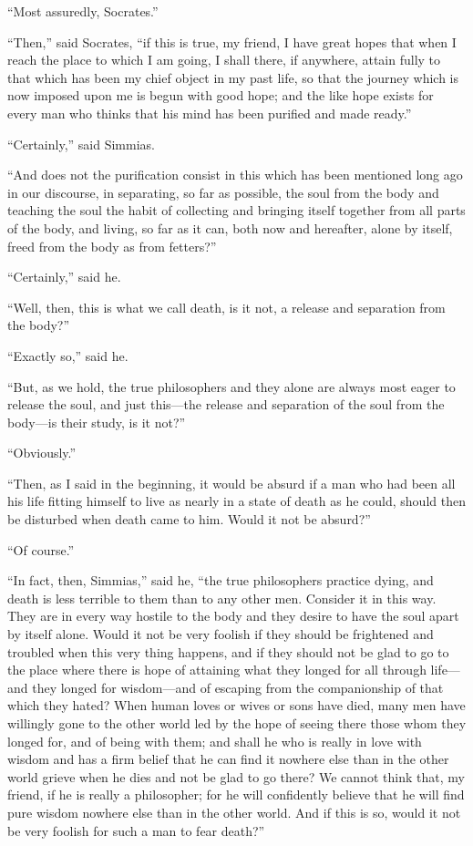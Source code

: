 \documentclass[letterpaper,12pt]{article}
\newcommand{\stephpag}[1]{\marginnote{\small\itshape\fontfamily{ppl}\selectfont #1}}
\begin{document}
\begin{drama}
``Most assuredly, Socrates.''
 
``Then,'' said Socrates, ``if this is true, my friend, I have great hopes that when I reach the place to which I am going, I shall there, if anywhere, attain fully to that which has been my chief object in my past life, so that the journey which is now \stephpag{c} imposed upon me is begun with good hope; and the like hope exists for every man who thinks that his mind has been purified and made ready.''
 
``Certainly,'' said Simmias.
 
``And does not the purification consist in this which has been mentioned long ago in our discourse, in separating, so far as possible, the soul from the body and teaching the soul the habit of collecting and bringing itself together from all parts of the body, and living, so far as it can, both now \stephpag{d} and hereafter, alone by itself, freed from the body as from fetters?''
 
``Certainly,'' said he.
 
``Well, then, this is what we call death, is it not, a release and separation from the body?''
 
``Exactly so,'' said he.
 
``But, as we hold, the true philosophers and they alone are always most eager to release the soul, and just this---the release and separation of the soul from the body---is their study, is it not?''
 
``Obviously.''
 
``Then, as I said in the beginning, it would be absurd if a man who had been all his life fitting himself to live as nearly \stephpag{e} in a state of death as he could, should then be disturbed when death came to him. Would it not be absurd?''
 
``Of course.''
 
``In fact, then, Simmias,'' said he, ``the true philosophers practice dying, and death is less terrible to them than to any other men. Consider it in this way. They are in every way hostile to the body and they desire to have the soul apart by itself alone. Would it not be very foolish if they should be frightened and troubled when this very thing happens, and if they should not be glad to go to the place where there is hope of attaining \stephpag{68 a} what they longed for all through life---and they longed for wisdom---and of escaping from the companionship of that which they hated? When human loves or wives or sons have died, many men have willingly gone to the other world led by the hope of seeing there those whom they longed for, and of being with them; and shall he who is really in love with wisdom and has a firm belief that he can find it nowhere else \stephpag{b} than in the other world grieve when he dies and not be glad to go there? We cannot think that, my friend, if he is really a philosopher; for he will confidently believe that he will find pure wisdom nowhere else than in the other world. And if this is so, would it not be very foolish for such a man to fear death?''
 

\end{drama}
\end{document}
